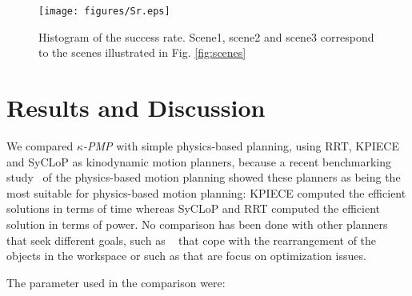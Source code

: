 \documentclass[twocolumn]{svjour3}          %
\begin{document}
\begin{figure}[h]
\begin{center}
   \texttt{[image: figures/Sr.eps]}
   \caption{Histogram of the success rate. Scene1, scene2 and scene3 correspond to the scenes illustrated in Fig. \ref{fig:scenes}}\label{fig:successrate}
\end{center}
\end{figure}

\section{Results and Discussion}\label{s-resultsdiscussion}

 We compared \textit{$\kappa$-PMP} with simple physics-based planning, using RRT, KPIECE and SyCLoP as kinodynamic motion planners, because a recent benchmarking study~\cite{gillani2016} of the physics-based motion planning showed these planners as being the most suitable for physics-based motion planning: KPIECE computed the efficient solutions in terms of time whereas SyCLoP and RRT computed the efficient solution in terms of power.
No comparison has been done with other planners that seek different goals, such as ~\cite{Haustein2015,stilman2005} that cope with the rearrangement of the objects in the workspace or such as \cite{li2016} that are focus on optimization issues. 

The parameter used in the comparison  were: 
\end{document}
